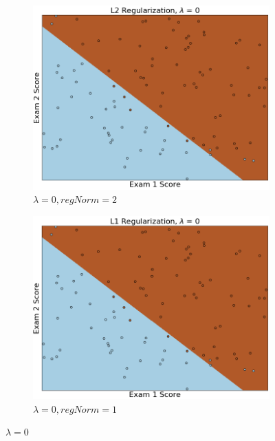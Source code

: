 \documentclass{article}
\begin{document}
\begin{enumerate}
    	\begin{figure}[h!]
     	\centering
     	\begin{subfigure}[b]{0.44\textwidth}
         	\centering
         	\includegraphics[width=\textwidth]
         	{Problem_1_3/fig_L2_1.png}
         	\caption{$\lambda = 0, regNorm = 2$}
         	\label{fig:L2_1}
     	\end{subfigure}
     	\hfill
     	\begin{subfigure}[b]{0.44\textwidth}
         	\centering
         	\includegraphics[width=\textwidth]
         	{Problem_1_3/fig_L1_1.png}
         	\caption{$\lambda = 0, regNorm = 1$}
         	\label{fig:L1_1}
     	\end{subfigure}
     	\caption{$\lambda=0$}
		\end{figure}
		

\end{enumerate}
\end{document}
